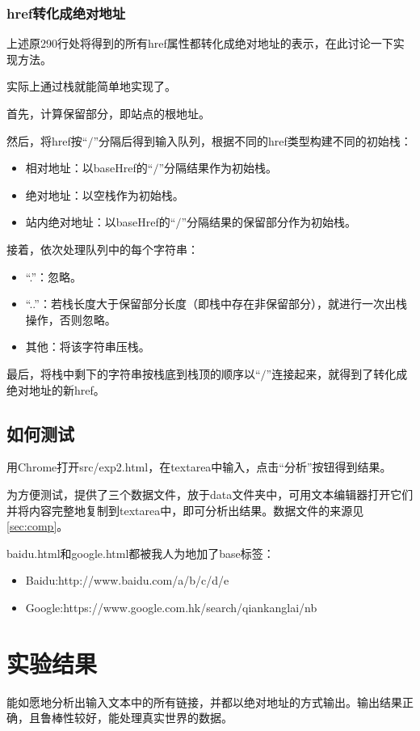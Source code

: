\documentclass[a4paper]{article}
\begin{document}
\begin{CJK*}{UTF8}{gbsn}
    \subsubsection{href转化成绝对地址}
    上述原290行处将得到的所有href属性都转化成绝对地址的表示，在此讨论一下实现方法。
    \par 实际上通过栈就能简单地实现了。
    \par 首先，计算保留部分，即站点的根地址。
    \par 然后，将href按“$/$”分隔后得到输入队列，根据不同的href类型构建不同的初始栈：
    \begin{itemize}
        \item 相对地址：以baseHref的“$/$”分隔结果作为初始栈。
        \item 绝对地址：以空栈作为初始栈。
        \item 站内绝对地址：以baseHref的“$/$”分隔结果的保留部分作为初始栈。
    \end{itemize}
    \par 接着，依次处理队列中的每个字符串：
    \begin{itemize}
        \item “.”：忽略。
        \item “..”：若栈长度大于保留部分长度（即栈中存在非保留部分），就进行一次出栈操作，否则忽略。
        \item 其他：将该字符串压栈。
    \end{itemize}
    \par 最后，将栈中剩下的字符串按栈底到栈顶的顺序以“$/$”连接起来，就得到了转化成绝对地址的新href。

    \subsection{如何测试}
    用Chrome打开src/exp2.html，在textarea中输入，点击“分析”按钮得到结果。
    \par 为方便测试，提供了三个数据文件，放于data文件夹中，可用文本编辑器打开它们并将内容完整地复制到textarea中，即可分析出结果。数据文件的来源见\ref{sec:comp}。
    \par baidu.html和google.html都被我人为地加了base标签：
    \begin{itemize}
        \item Baidu:http://www.baidu.com/a/b/c/d/e
        \item Google:https://www.google.com.hk/search/qiankanglai/nb
    \end{itemize}

    \section{实验结果}
    能如愿地分析出输入文本中的所有链接，并都以绝对地址的方式输出。输出结果正确，且鲁棒性较好，能处理真实世界的数据。

\clearpage
\end{CJK*}
\end{document}
